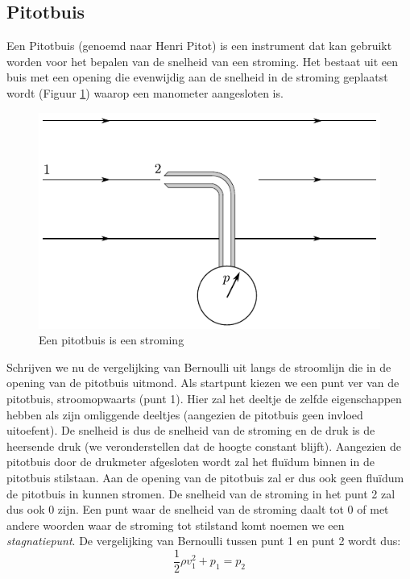 		\subsection{Pitotbuis}
Een Pitotbuis (genoemd naar Henri Pitot) is een instrument dat kan gebruikt worden voor het bepalen van de snelheid van een stroming. Het bestaat uit een buis met een opening die evenwijdig aan de snelheid in de stroming geplaatst wordt (Figuur \ref{fig:pitotbuis}) waarop een manometer aangesloten is.
\begin{figure}[htb]
	\centering
	\includegraphics{fig/deeltjesvergelijkingen/Pitotbuis}
	\caption{Een pitotbuis is een stroming}
	\label{fig:pitotbuis}
\end{figure}
Schrijven we nu de vergelijking van Bernoulli uit langs de stroomlijn die in de opening van de pitotbuis uitmond. Als startpunt kiezen we een punt ver van de pitotbuis, stroomopwaarts (punt 1). Hier zal het deeltje de zelfde eigenschappen hebben als zijn omliggende deeltjes (aangezien de pitotbuis geen invloed uitoefent). De snelheid is dus de snelheid van de stroming en de druk is de heersende druk (we veronderstellen dat de hoogte constant blijft). Aangezien de pitotbuis door de drukmeter afgesloten wordt zal het fluïdum binnen in de pitotbuis stilstaan. Aan de opening van de pitotbuis zal er dus ook geen fluïdum de pitotbuis in kunnen stromen. De snelheid van de stroming in het punt 2 zal dus ook 0 zijn. Een punt waar de snelheid van de stroming daalt tot 0 of met andere woorden waar de stroming tot stilstand komt noemen we een \emph{stagnatiepunt}. De vergelijking van Bernoulli tussen punt 1 en punt 2 wordt dus:
\begin{equation}
	\frac{1}{2} \rho v_1^2 + p_1 = p_2
\end{equation}
